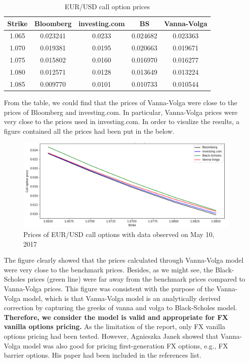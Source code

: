 \begin{table}[htb]
\centering
\caption{EUR/USD call option prices}
\begin{tabular}{ccccc}
\hline \hline
Strike & Bloomberg & investing.com & BS & Vanna-Volga \\ [0.5ex]
\hline
1.065 &	0.023241&	0.0233	&0.024682&	0.023363 \\ 
1.070&	0.019381&	0.0195&	0.020663&	0.019671\\
1.075	&0.015802&	0.0160&	0.016970&	0.016277 \\
1.080	&0.012571&	0.0128&	0.013649&	0.013224\\
1.085	&0.009770&	0.0101&	0.010733&	0.010544 \\ [0.5ex]
\hline
\end{tabular}
\label{table:prices}
\end{table}

\noindent
From the table, we could find that the prices of Vanna-Volga were close to the prices of Bloomberg and investing.com. In particular, Vanna-Volga prices were very close to the prices used in investing.com. In order to visulize the results, a figure contained all the prices had been put in the below.

\begin{figure}[htb]
	\centering
\includegraphics[scale=0.4]{./Testing-data/EURUSD-prices.png} 
\caption{Prices of EUR/USD call options with data observed on May 10, 2017}
\label{fig:prices-label} %
\end{figure}

\noindent
The figure clearly showed that the prices calculated through Vanna-Volga model were very close to the benchmark prices. Besides, as we might see, the Black-Scholes prices (green line) were far away from the benchmark prices compared to Vanna-Volga prices. This figure was consistent with the purpose of the Vanna-Volga model, which is that Vanna-Volga model is an analytically derived correction by capturing the greeks of vanna and volga to Black-Scholes model. \textbf{Therefore, we consider the model is valid and appropriate for FX vanilla options pricing.} As the limitation of the report, only FX vanilla options pricing had been tested. However, Agnieszka Janek showed that Vanna-Volga model was also good for pricing first-generation FX options, e.g., FX barrier options. His paper had been included in the references list.

